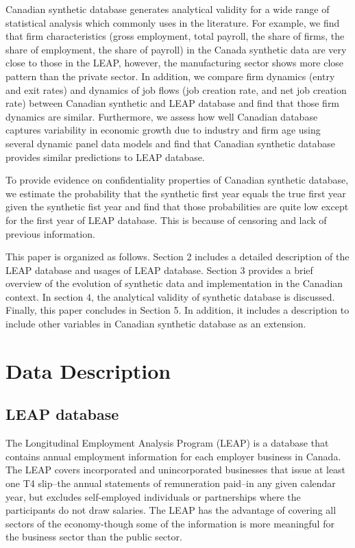 \documentclass{article}
\begin{document}
Canadian synthetic database generates analytical validity for a wide range of statistical analysis which commonly uses in the literature. For example, we find that firm characteristics (gross employment, total payroll, the share of firms, the share of employment, the share of payroll) in the Canada synthetic data are very close to those in the LEAP, however, the manufacturing sector shows more close pattern than the private sector.  In addition, we compare firm dynamics (entry and exit rates) and dynamics of job flows (job creation rate, and net job creation rate) between Canadian synthetic and LEAP database and find that those firm dynamics are similar. Furthermore, we assess how well Canadian database captures variability in economic growth due to industry and firm age using several dynamic panel data models and find that Canadian synthetic database provides similar predictions to LEAP database. 

To provide evidence on confidentiality properties of Canadian synthetic database, we estimate the probability that the synthetic first year equals the true first year given the synthetic fist year and find that those probabilities are quite low except for the first year of LEAP database. This is because of censoring and lack of previous information. 


This paper is organized as follows. Section 2 includes a detailed description of the LEAP database and usages of LEAP database. Section 3 provides a brief overview of the evolution of synthetic data and implementation in the Canadian context. In section 4, the analytical validity of synthetic database is discussed. Finally, this paper concludes in Section 5. In addition, it includes a description to include other variables in Canadian synthetic database as an extension. 

 




\section{Data Description}
\subsection{LEAP database}

The Longitudinal Employment Analysis Program (LEAP) is a database that contains annual employment information for each employer business in Canada. The LEAP covers incorporated and unincorporated businesses that issue at least one T4 slip--the annual statements of remuneration paid--in any given calendar year, but excludes self-employed individuals or partnerships where the participants do not draw salaries. The LEAP has the advantage of covering all sectors of the economy-though some of the information is more meaningful for the business sector than the public sector.
\end{document}
